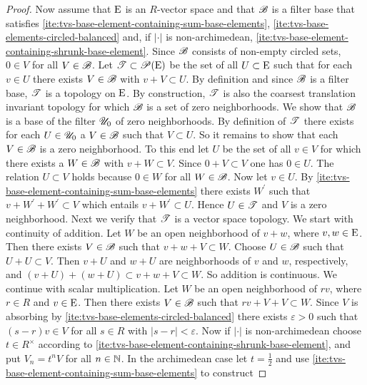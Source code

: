 \begin{proof}
  Now assume that $\mathrm{E}$ is an $R$-vector space and that $\mathscr{B}$ is a filter base that satisfies
  \ref{ite:tvs-base-element-containing-sum-base-elements}, \ref{ite:tvs-base-elements-circled-balanced} and,
  if $|\cdot|$ is non-archimedean, \ref{ite:tvs-base-element-containing-shrunk-base-element}.
  Since $\mathscr{B}$ consists of non-empty circled sets, $0\in V$ for all $V\in\mathscr{B}$. Let
  $\mathscr{T} \subset \mathscr{P}(\mathrm{E})$ be the set of all $U\subset \mathrm{E}$ such that
  for each $v\in U$ there exists $V\in \mathscr{B}$ with $v+V \subset U$. By definition and since $\mathscr{B}$ is a
  filter base, $\mathscr{T}$ is a topology on $\mathrm{E}$.
  By construction, $\mathscr{T}$ is also the coarsest translation invariant topology for which $\mathscr{B}$ is a set of zero neighborhoods. We show that $\mathscr{B}$ is a base of the filter
  $\mathscr{U}_0$ of zero neighborhoods. By definition of $\mathscr{T}$ there exists for each $U \in \mathscr{U}_0$
  a $V\in \mathscr{B}$ such that $V\subset U$. So it remains to show that each $V\in \mathscr{B}$ is a zero neighborhood.
  To this end let $U$ be the set of all $v\in V$ for which there exists
  a $W\in \mathscr{B}$ with $v + W \subset V$. Since $0 +V \subset V$ one has $0\in U$. The relation 
  $U \subset V$ holds because  $0\in W$ for all $W\in \mathscr{B}$.  Now let $v \in U$.
  By \ref{ite:tvs-base-element-containing-sum-base-elements} there exists $W^\prime$ such that 
  $v + W^\prime + W^\prime \subset V$ which entails $v + W^\prime \subset U$. Hence $U\in\mathscr{T}$
  and $V$ is a zero neighborhood. 
  Next we verify that $\mathscr{T}$ is a vector space topology. We start with continuity of addition.   
  Let $W$ be an open neighborhood of $v+w$, where $v,w\in \mathrm{E}$. Then there exists $V\in \mathscr{B}$ such that
  $v+w + V \subset W$. Choose $U\in \mathscr{B} $ such that $U+U \subset V$. Then  
  $v+U$ and $w +U$ are neighborhoods of $v$ and $w$, respectively, and $(v+U) + (w +U) \subset v+w +V\subset W$.
  So addition is continuous. We continue with scalar multiplication. Let $W$ be an open neighborhood of $rv$,
  where $r\in R$ and $v\in \mathrm{E}$. Then there exists $V \in \mathscr{B} $ such that $rv + V + V \subset W$.
  Since $V$ is absorbing by \ref{ite:tvs-base-elements-circled-balanced} there exists $\varepsilon >0$ such that
  $ (s-r)v \in V$ for all $s\in R$ with  $|s-r| < \varepsilon$. Now if $|\cdot|$ is non-archimedean
  choose $t\in R^\times$ according to \ref{ite:tvs-base-element-containing-shrunk-base-element}, 
  and put $V_n = t^n V$ for all $n\in\mathbb{N}$.
  In the archimedean case let $t = \frac 12$ and use \ref{ite:tvs-base-element-containing-sum-base-elements} to construct

\end{proof}
